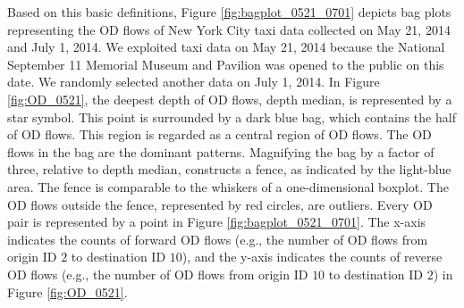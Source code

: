 \documentclass[a4paper,UKenglish]{lipics-v2018}
\begin{document}
Based on this basic definitions, Figure \ref{fig:bagplot_0521_0701} depicts bag plots representing the OD flows of New York City taxi data collected on May 21, 2014 and July 1, 2014. We exploited taxi data on May 21, 2014 because the National September 11 Memorial Museum and Pavilion was opened to the public on this date. We randomly selected another data on July 1, 2014.  In Figure \ref{fig:OD_0521}, the deepest depth of OD flows, depth median, is represented by a star symbol. This point is surrounded by a dark blue bag, which contains the half of OD flows. This region is regarded as a central region of OD flows. The OD flows in the bag are the dominant patterns.  Magnifying the bag by a factor of three, relative to depth median, constructs a fence, as indicated by the light-blue area. The fence is comparable to the whiskers of a one-dimensional boxplot. The OD flows outside the fence, represented by red circles, are outliers. Every OD pair is represented by a point in Figure \ref{fig:bagplot_0521_0701}. The x-axis indicates the counts of forward OD flows (e.g., the number of OD flows from origin ID $2$ to destination ID $10$), and the y-axis indicates the counts of reverse OD flows (e.g., the number of OD flows from origin ID $10$ to destination  ID $2$) in Figure \ref{fig:OD_0521}.
\end{document}

